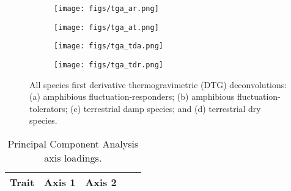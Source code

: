 \documentclass[12pt]{article}\usepackage[]{graphicx}\usepackage[]{color}
\begin{document}
\begin{figure}[!ht]
\centering
	\begin{subfigure}[ht]{0.9\textwidth}
		\texttt{[image: figs/tga\_ar.png]}
		\label{Fig:tga_ar}
	\end{subfigure}\hfill
\end{figure}
\begin{figure}[!ht]\ContinuedFloat
	\begin{subfigure}[ht]{0.9\textwidth}
		\texttt{[image: figs/tga\_at.png]}
		\label{Fig:tga_at}
	\end{subfigure}\hfill
\end{figure}
\begin{figure}[!ht]\ContinuedFloat
	\begin{subfigure}[ht]{0.9\textwidth}
		\texttt{[image: figs/tga\_tda.png]}
		\label{Fig:tga_tda}
	\end{subfigure}\hfill
\end{figure}
\begin{figure}[!ht]\ContinuedFloat
	\begin{subfigure}[ht]{0.9\textwidth}
		\texttt{[image: figs/tga\_tdr.png]}
		\label{Fig:tga_tdr}
	\end{subfigure}
	\caption{All species first derivative thermogravimetric (DTG) deconvolutions: (a) amphibious fluctuation-responders; (b) amphibious fluctuation-tolerators; (c) terrestrial damp species; and (d) terrestrial dry species.}
	\label{Fig:tga_all}
\end{figure}

\begin{table}[!htbp]\centering
	\caption{Principal Component Analysis axis loadings.}
	\label{Tab:pca}
	\begin{tabular}{l r r r r}
        		\toprule
        		Trait & Axis 1 & Axis 2 \\
        		\midrule
		
        		\bottomrule
	\end{tabular}
\end{table}
\end{document}
